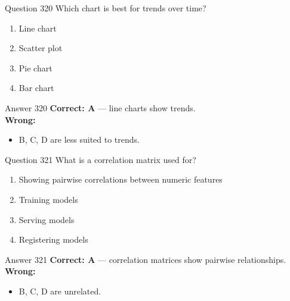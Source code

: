\documentclass[aspectratio=169,11pt]{beamer}
\begin{document}
	\begin{frame}{Question 320}
		Which chart is best for trends over time?
		\begin{enumerate}[label=\Alph*.]
			\item Line chart
			\item Scatter plot
			\item Pie chart
			\item Bar chart
		\end{enumerate}
	\end{frame}
	\begin{frame}{Answer 320}
		\textbf{Correct: A} --- line charts show trends.\\
		\vspace{0.5em}
		\textbf{Wrong:}
		\begin{itemize}
			\item B, C, D are less suited to trends.
		\end{itemize}
	\end{frame}
	
	\begin{frame}{Question 321}
		What is a correlation matrix used for?
		\begin{enumerate}[label=\Alph*.]
			\item Showing pairwise correlations between numeric features
			\item Training models
			\item Serving models
			\item Registering models
		\end{enumerate}
	\end{frame}
	\begin{frame}{Answer 321}
		\textbf{Correct: A} --- correlation matrices show pairwise relationships.\\
		\vspace{0.5em}
		\textbf{Wrong:}
		\begin{itemize}
			\item B, C, D are unrelated.
		\end{itemize}
	\end{frame}
	
\end{document}
